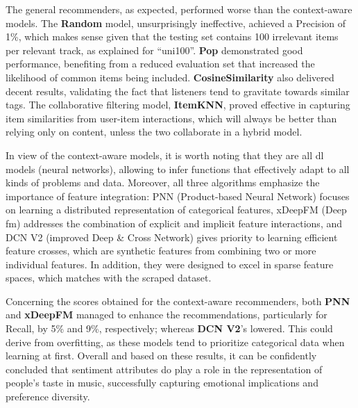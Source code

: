 The general recommenders, as expected, performed worse than the context-aware models. The \textbf{Random} model, unsurprisingly ineffective, achieved a Precision of 1\%, which makes sense given that the testing set contains 100 irrelevant items per relevant track, as explained for ``uni100''. \textbf{Pop} demonstrated good performance, benefiting from a reduced evaluation set that increased the likelihood of common items being included. \textbf{CosineSimilarity} also delivered decent results, validating the fact that listeners tend to gravitate towards similar tags. The collaborative filtering model, \textbf{ItemKNN}, proved effective in capturing item similarities from user-item interactions, which will always be better than relying only on content, unless the two collaborate in a hybrid model.

In view of the context-aware models, it is worth noting that they are all \acl{dl} models (neural networks), allowing to infer functions that effectively adapt to all kinds of problems and data. Moreover, all three algorithms emphasize the importance of feature integration: PNN (Product-based Neural Network) focuses on learning a distributed representation of categorical features, xDeepFM (Deep \acl{fm}) addresses the combination of explicit and implicit feature interactions, and DCN V2 (improved Deep \& Cross Network) gives priority to learning efficient feature crosses, which are synthetic features from combining two or more individual features. In addition, they were designed to excel in sparse feature spaces, which matches with the scraped dataset.

Concerning the scores obtained for the context-aware recommenders, both \textbf{PNN} and \textbf{xDeepFM} managed to enhance the recommendations, particularly for Recall, by 5\% and 9\%, respectively; whereas \textbf{DCN V2}'s lowered. This could derive from overfitting, as these models tend to prioritize categorical data when learning at first. Overall and based on these results, it can be confidently concluded that sentiment attributes do play a role in the representation of people's taste in music, successfully capturing emotional implications and preference diversity.